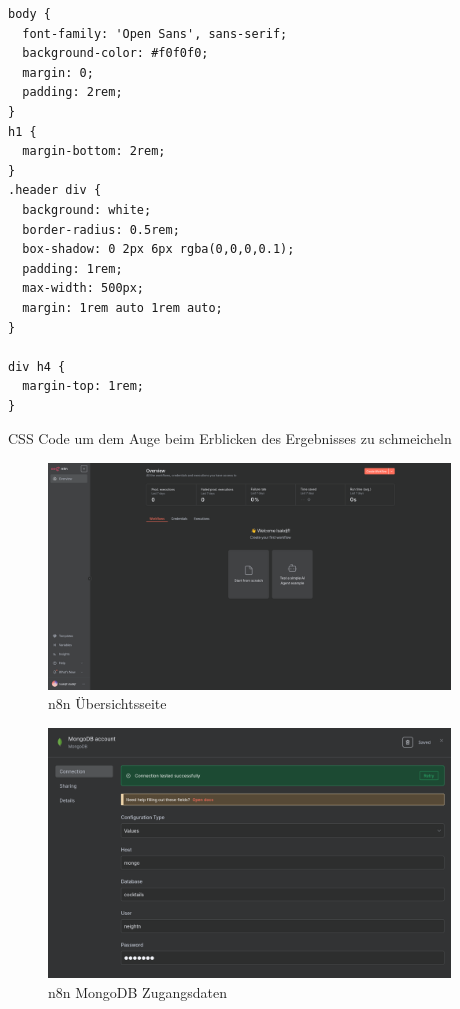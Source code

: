 \begin{listing}[htbp]
\begin{verbatim}
body {
  font-family: 'Open Sans', sans-serif;
  background-color: #f0f0f0;
  margin: 0;
  padding: 2rem;
}
h1 {
  margin-bottom: 2rem;
}
.header div {
  background: white;
  border-radius: 0.5rem;
  box-shadow: 0 2px 6px rgba(0,0,0,0.1);
  padding: 1rem;
  max-width: 500px;
  margin: 1rem auto 1rem auto;
}

div h4 {
  margin-top: 1rem;
}
\end{verbatim}
\caption{CSS Code um dem Auge beim Erblicken des Ergebnisses zu schmeicheln}
\label{lst:descr:js:code5}
\end{listing}
\clearpage
\begin{figure}
    \begin{center}
        \includegraphics[width=0.95\textwidth]{images/n8n_overview.png}
    \end{center}
    \caption{n8n Übersichtsseite}\label{fig:n8n_overview}
\end{figure}

\begin{figure}
    \begin{center}
        \includegraphics[width=0.95\textwidth]{images/n8n_mongo_creds.png}
    \end{center}
    \caption{n8n MongoDB Zugangsdaten}\label{fig:n8n_mongo_creds}
\end{figure}

